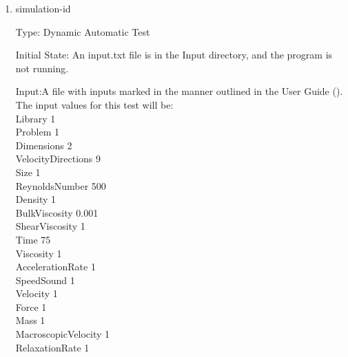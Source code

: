 \documentclass[12pt, titlepage]{article}
\newcommand{\myprogname}{Lattice Boltzmann Solver}
\newcounter{uvtestcounter} %
\begin{document}
\begin{enumerate}
	How test will be performed: 
	\begin{enumerate}
		\item Outside of the system, the input parameter values will be written to a text file titled input.txt, as outlined in the User Guide.
		\item The file will be placed into the Input directory, under the home directory of the project.
		\item M2SystemControl module shall be modified to print the problem parameters and boundary data variable contents.
		\item {\myprogname} shall be run. 
		\item The output values that are printed shall be compared with problem-boundary-data-id1.txt. This can be done by hashing and comparing the contents. We can use hashing for this test since the problem module should return exactly the same contents as the pseudo-oracle. There is no math involved in setting up these parameters, only the structure of the problem data is created.
	\end{enumerate}
	
	\item{simulation-id\theuvtestcounter\\}
	
	Type: Dynamic Automatic Test
	
		Initial State: An input.txt file is in the Input directory, and the program is not running.
	
	Input:A file with inputs marked in the manner outlined in the
	User Guide (\citet{LBM_UserGuide_PM}).\\The input values for this test will
	be:\\
	
	Library 1\\
	Problem 1\\
	Dimensions 2\\
	VelocityDirections 9\\
	Size 1\\
	ReynoldsNumber 500\\
	Density 1\\
	BulkViscosity 0.001\\
	ShearViscosity 1\\
	Time 75\\
	Viscosity 1\\
	AccelerationRate 1\\
	SpeedSound 1\\
	Velocity 1\\
	Force 1\\
	Mass 1\\
	MacroscopicVelocity 1\\
	RelaxationRate 1\\
	

\end{enumerate}
\end{document}
